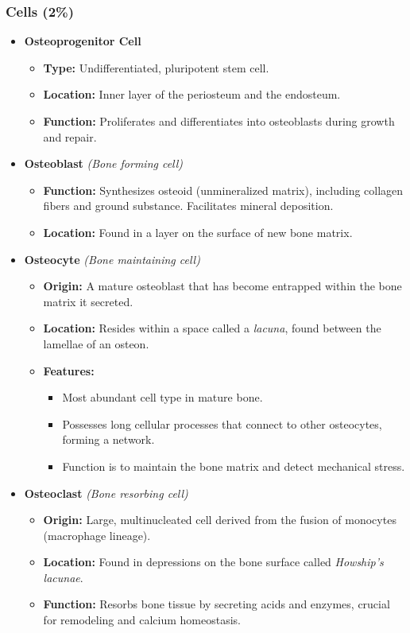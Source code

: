 \documentclass[11pt]{article}
\begin{document}
\subsubsection*{Cells (2\%)}
\begin{itemize}
    \item \textbf{Osteoprogenitor Cell}
    \begin{itemize}
        \item \textbf{Type:} Undifferentiated, pluripotent stem cell.
        \item \textbf{Location:} Inner layer of the periosteum and the endosteum.
        \item \textbf{Function:} Proliferates and differentiates into osteoblasts during growth and repair.
    \end{itemize}
    
    \item \textbf{Osteoblast} \textit{(Bone forming cell)}
    \begin{itemize}
        \item \textbf{Function:} Synthesizes osteoid (unmineralized matrix), including collagen fibers and ground substance. Facilitates mineral deposition.
        \item \textbf{Location:} Found in a layer on the surface of new bone matrix.
    \end{itemize}
    
    \item \textbf{Osteocyte}  \textit{(Bone maintaining cell)}
    \begin{itemize}
        \item \textbf{Origin:} A mature osteoblast that has become entrapped within the bone matrix it secreted.
        \item \textbf{Location:} Resides within a space called a \textit{lacuna}, found between the lamellae of an osteon.
        \item \textbf{Features:} 
        \begin{itemize}
            \item Most abundant cell type in mature bone.
            \item Possesses long cellular processes that connect to other osteocytes, forming a network.
            \item Function is to maintain the bone matrix and detect mechanical stress.
        \end{itemize}
    \end{itemize}
    
    \item \textbf{Osteoclast}  \textit{(Bone resorbing cell)}
    \begin{itemize}
        \item \textbf{Origin:} Large, multinucleated cell derived from the fusion of monocytes (macrophage lineage).
        \item \textbf{Location:} Found in depressions on the bone surface called \textit{Howship's lacunae}.
        \item \textbf{Function:} Resorbs bone tissue by secreting acids and enzymes, crucial for remodeling and calcium homeostasis.
    \end{itemize}
\end{itemize}
\end{document}
